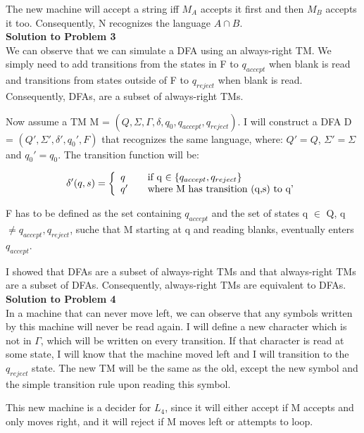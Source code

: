 \documentclass[letterpaper,12pt]{article}
\begin{document}
The new machine will accept a string iff $M_A$ accepts it first and then $M_B$ accepts it too. Consequently, N recognizes the language $A \cap B$.\\

\noindent\textbf{Solution to Problem 3}\\
We can observe that we can simulate a DFA using an always-right TM. We simply need to add transitions from the states in F to $q_{accept}$ when blank is read and transitions from states outside of F to $q_{reject}$ when blank is read. Consequently, DFAs, are a subset of always-right TMs.

Now assume a TM M = $(Q, \Sigma, \Gamma, \delta, q_0, q_{accept}, q_{reject})$. I will construct a DFA D = $(Q',\Sigma',\delta', q_0', F)$ that recognizes the same language, where:
$ Q' = Q $, $\Sigma' = \Sigma$ and $q_0' = q_0$. The transition function will be:

\begin{equation}
\delta'(q,s) = \left\{ 
  \begin{array}{l l}
    q & \quad \text{if q $\in \{q_{accept}, q_{reject}\}$ }\\
    q' & \quad \text{where M has transition (q,s) to q'}
  \end{array} \right.
\end{equation}

F has to be defined as the set containing $q_{accept}$ and the set of states q $\in$ Q, q $\ne q_{accept}, q_{reject}$, suche that M starting at q and reading blanks, eventually enters $q_{accept}$.

I showed that DFAs are a subset of always-right TMs and that always-right TMs are a subset of DFAs. Consequently, always-right TMs are equivalent to DFAs.\\

\noindent\textbf{Solution to Problem 4}\\  
In a machine that can never move left, we can observe that any symbols written by this machine will never be read again. I will define a new character which is not in $\Gamma$, which will be written on every transition. If that character is read at some state, I will know that the machine moved left and I will transition to the $q_{reject}$ state. The new TM will be the same as the old, except the new symbol and the simple transition rule upon reading this symbol.

This new machine is a decider for $L_4$, since it will either accept if M accepts and only moves right, and it will reject if M moves left or attempts to loop.
\end{document}
